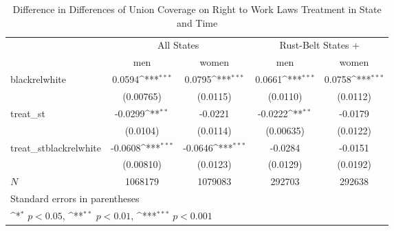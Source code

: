 \begin{table}[htbp]\centering
\def\sym#1{\ifmmode^{#1}\else\(^{#1}\)\fi}
\caption{Difference in Differences of Union Coverage on Right to Work Laws Treatment in State and Time}
\begin{tabular}{l*{4}{c}}
\hline\hline
            &\multicolumn{2}{c}{All States}             &\multicolumn{2}{c}{Rust-Belt States +}     \\\cmidrule(lr){2-3}\cmidrule(lr){4-5}
            &\multicolumn{1}{c}{men}&\multicolumn{1}{c}{women}&\multicolumn{1}{c}{men}&\multicolumn{1}{c}{women}\\
\hline
blackrelwhite&      0.0594\sym{***}&      0.0795\sym{***}&      0.0661\sym{***}&      0.0758\sym{***}\\
            &   (0.00765)         &    (0.0115)         &    (0.0110)         &    (0.0112)         \\
[1em]
treat\_st    &     -0.0299\sym{**} &     -0.0221         &     -0.0222\sym{**} &     -0.0179         \\
            &    (0.0104)         &    (0.0114)         &   (0.00635)         &    (0.0122)         \\
[1em]
treat\_stblackrelwhite&     -0.0608\sym{***}&     -0.0646\sym{***}&     -0.0284         &     -0.0151         \\
            &   (0.00810)         &    (0.0123)         &    (0.0129)         &    (0.0192)         \\
\hline
\(N\)       &     1068179         &     1079083         &      292703         &      292638         \\
\hline\hline
\multicolumn{5}{l}{\footnotesize Standard errors in parentheses}\\
\multicolumn{5}{l}{\footnotesize \sym{*} \(p<0.05\), \sym{**} \(p<0.01\), \sym{***} \(p<0.001\)}\\
\end{tabular}
\end{table}

